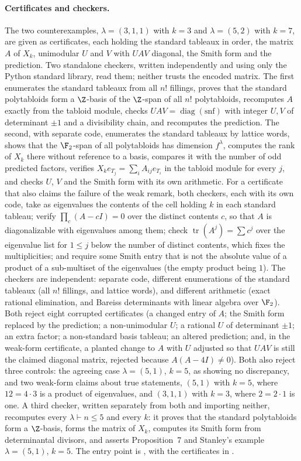 \paragraph{Certificates and checkers.} The two counterexamples,
$\lambda=(3,1,1)$ with $k=3$ and $\lambda=(5,2)$ with $k=7$, are given as
certificates, each holding the standard tableaux in order, the
matrix $A$ of $X_k$, unimodular $U$ and $V$ with $UAV$ diagonal, the Smith
form and the prediction. Two standalone checkers, written independently and
using only the Python standard library, read them; neither trusts the
encoded matrix. The first enumerates the standard
tableaux from all $n!$ fillings, proves that the standard polytabloids form a
$\Z$-basis of the $\Z$-span of all $n!$ polytabloids, recomputes $A$ exactly
from the tabloid module, checks $UAV=\operatorname{diag}(\text{snf})$ with
integer $U,V$ of determinant $\pm1$ and a divisibility chain, and recomputes
the prediction. The second, with separate code, enumerates the standard
tableaux by lattice words, shows that the $\F_2$-span of all polytabloids has
dimension $f^\lambda$, computes the rank of $X_k$ there without reference to
a basis, compares it with the number of odd predicted factors, verifies
$X_ke_{T_j}=\sum_iA_{ij}e_{T_i}$ in the tabloid module for every $j$, and
checks $U$, $V$ and the Smith form with its own arithmetic. For a
certificate that also claims the failure of the weak remark, both checkers,
each with its own code, take as eigenvalues the contents of the cell holding
$k$ in each standard tableau; verify $\prod_c(A-cI)=0$ over the distinct
contents $c$, so that $A$ is diagonalizable with eigenvalues among them;
check $\operatorname{tr}(A^j)=\sum c^j$ over the eigenvalue list for $1\le j$
below the number of distinct contents, which fixes the multiplicities; and
require some Smith entry that is not the absolute value of a product of a
sub-multiset of the eigenvalues (the empty product being $1$). The checkers are independent: separate code, different
enumerations of the standard tableaux (all $n!$ fillings, and lattice
words), and different arithmetic (exact rational elimination, and Bareiss
determinants with linear algebra over $\F_2$). Both reject eight corrupted certificates (a changed entry of $A$; the
Smith form replaced by the prediction; a non-unimodular $U$; a rational $U$
of determinant $\pm1$; an extra factor; a non-standard basis tableau; an
altered prediction; and, in the weak-form certificate, a planted change to
$A$ with $U$ adjusted so that $UAV$ is still the claimed diagonal matrix,
rejected because $A(A-4I)\ne0$). Both also reject three controls: the
agreeing case $\lambda=(5,1)$, $k=5$, as showing no discrepancy, and two
weak-form claims about true statements, $(5,1)$ with $k=5$, where
$12=4\cdot3$ is a product of eigenvalues, and $(3,1,1)$ with $k=3$, where
$2=2\cdot1$ is one. A third checker, written separately from both and
importing neither, recomputes every $\lambda\vdash n\le5$ and every $k$: it
proves that the standard polytabloids form a $\Z$-basis, forms the matrix of
$X_k$, computes its Smith form from determinantal divisors, and asserts
Proposition~7 and Stanley's example $\lambda=(5,1)$, $k=5$.
The entry point is , with the certificates in
.

